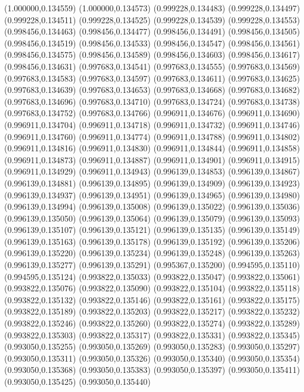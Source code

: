 (1.000000,0.134559)
(1.000000,0.134573)
(0.999228,0.134483)
(0.999228,0.134497)
(0.999228,0.134511)
(0.999228,0.134525)
(0.999228,0.134539)
(0.999228,0.134553)
(0.998456,0.134463)
(0.998456,0.134477)
(0.998456,0.134491)
(0.998456,0.134505)
(0.998456,0.134519)
(0.998456,0.134533)
(0.998456,0.134547)
(0.998456,0.134561)
(0.998456,0.134575)
(0.998456,0.134589)
(0.998456,0.134603)
(0.998456,0.134617)
(0.998456,0.134631)
(0.997683,0.134541)
(0.997683,0.134555)
(0.997683,0.134569)
(0.997683,0.134583)
(0.997683,0.134597)
(0.997683,0.134611)
(0.997683,0.134625)
(0.997683,0.134639)
(0.997683,0.134653)
(0.997683,0.134668)
(0.997683,0.134682)
(0.997683,0.134696)
(0.997683,0.134710)
(0.997683,0.134724)
(0.997683,0.134738)
(0.997683,0.134752)
(0.997683,0.134766)
(0.996911,0.134676)
(0.996911,0.134690)
(0.996911,0.134704)
(0.996911,0.134718)
(0.996911,0.134732)
(0.996911,0.134746)
(0.996911,0.134760)
(0.996911,0.134774)
(0.996911,0.134788)
(0.996911,0.134802)
(0.996911,0.134816)
(0.996911,0.134830)
(0.996911,0.134844)
(0.996911,0.134858)
(0.996911,0.134873)
(0.996911,0.134887)
(0.996911,0.134901)
(0.996911,0.134915)
(0.996911,0.134929)
(0.996911,0.134943)
(0.996139,0.134853)
(0.996139,0.134867)
(0.996139,0.134881)
(0.996139,0.134895)
(0.996139,0.134909)
(0.996139,0.134923)
(0.996139,0.134937)
(0.996139,0.134951)
(0.996139,0.134965)
(0.996139,0.134980)
(0.996139,0.134994)
(0.996139,0.135008)
(0.996139,0.135022)
(0.996139,0.135036)
(0.996139,0.135050)
(0.996139,0.135064)
(0.996139,0.135079)
(0.996139,0.135093)
(0.996139,0.135107)
(0.996139,0.135121)
(0.996139,0.135135)
(0.996139,0.135149)
(0.996139,0.135163)
(0.996139,0.135178)
(0.996139,0.135192)
(0.996139,0.135206)
(0.996139,0.135220)
(0.996139,0.135234)
(0.996139,0.135248)
(0.996139,0.135263)
(0.996139,0.135277)
(0.996139,0.135291)
(0.995367,0.135200)
(0.994595,0.135110)
(0.994595,0.135124)
(0.993822,0.135033)
(0.993822,0.135047)
(0.993822,0.135061)
(0.993822,0.135076)
(0.993822,0.135090)
(0.993822,0.135104)
(0.993822,0.135118)
(0.993822,0.135132)
(0.993822,0.135146)
(0.993822,0.135161)
(0.993822,0.135175)
(0.993822,0.135189)
(0.993822,0.135203)
(0.993822,0.135217)
(0.993822,0.135232)
(0.993822,0.135246)
(0.993822,0.135260)
(0.993822,0.135274)
(0.993822,0.135289)
(0.993822,0.135303)
(0.993822,0.135317)
(0.993822,0.135331)
(0.993822,0.135345)
(0.993050,0.135255)
(0.993050,0.135269)
(0.993050,0.135283)
(0.993050,0.135297)
(0.993050,0.135311)
(0.993050,0.135326)
(0.993050,0.135340)
(0.993050,0.135354)
(0.993050,0.135368)
(0.993050,0.135383)
(0.993050,0.135397)
(0.993050,0.135411)
(0.993050,0.135425)
(0.993050,0.135440)

